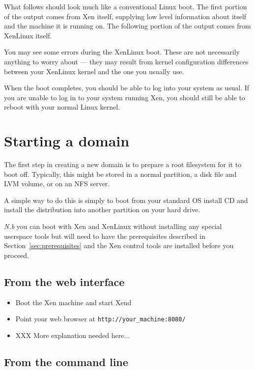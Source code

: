 \documentclass[11pt,twoside,final,openright]{xenstyle}
\begin{document}
What follows should look much like a conventional Linux boot.  The
first portion of the output comes from Xen itself, supplying low level
information about itself and the machine it is running on.  The
following portion of the output comes from XenLinux itself.

You may see some errors during the XenLinux boot.  These are not
necessarily anything to worry about --- they may result from kernel
configuration differences between your XenLinux kernel and the one you
usually use.

When the boot completes, you should be able to log into your system as
usual.  If you are unable to log in to your system running Xen, you
should still be able to reboot with your normal Linux kernel.


\chapter{Starting a domain}

The first step in creating a new domain is to prepare a root
filesystem for it to boot off.  Typically, this might be stored in a
normal partition, a disk file and LVM volume, or on an NFS server.

A simple way to do this is simply to boot from your standard OS
install CD and install the distribution into another partition on your
hard drive.

{\em N.b } you can boot with Xen and XenLinux without installing any
special userspace tools but will need to have the prerequisites
described in Section~\ref{sec:prerequisites} and the Xen control tools
are installed before you proceed.

\section{From the web interface}

\begin{itemize}
\item Boot the Xen machine and start Xend
\item Point your web browser at {\tt http://your\_machine:8080/}
\item XXX More explanation needed here...
\end{itemize}

\section{From the command line}
\end{document}

